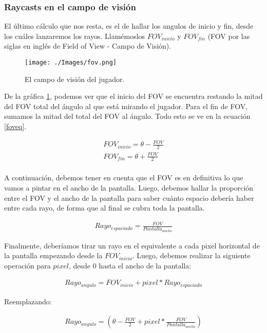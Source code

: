 \subsubsection{Raycasts en el campo de visión}

El último cálculo que nos resta, es el de hallar los angulos de inicio y fin, desde los cuáles lanzaremos los rayos. Llamémoslos $FOV_{inicio}$ y $FOV_{fin}$ (FOV por las siglas en inglés de Field of View - Campo de Visión).

\begin{figure}[h!]
	\centering
	\texttt{[image: ./Images/fov.png]}
	\caption{El campo de visión del jugador.}
	\label{fovgraph}
\end{figure}

De la gráfica \ref{fovgraph}, podemos ver que el inicio del FOV se encuentra restando la mitad del FOV total del ángulo al que está mirando el jugador. Para el fin de FOV, sumamos la mitad del total del FOV al ángulo. Todo esto se ve en la ecuación \ref{foveq}. 

\begin{equation}
\begin{aligned}
\label{foveq}
FOV_{inicio} = \theta - \frac{FOV}{2}\\
FOV_{fin} = \theta + \frac{FOV}{2} \\
\end{aligned}
\end{equation}

A continuación, debemos tener en cuenta que el FOV es en definitiva lo que vamos a pintar en el ancho de la pantalla. Luego, debemos hallar la proporción entre el FOV y el ancho de la pantalla para saber cuánto espacio debería haber entre cada rayo, de forma que al final se cubra toda la pantalla.

\begin{equation}
\begin{aligned}
\label{foveq}
Rayo_{espaciado} = \frac{FOV}{Pantalla_{ancho}}
\end{aligned}
\end{equation}

Finalmente, deberíamos tirar un rayo en el equivalente a cada pixel horizontal de la pantalla empezando desde la $FOV_{inicio}$. Luego, debemos realizar la siguiente operación para $pixel$, desde 0 hasta el ancho de la pantalla:

\begin{equation}
\begin{aligned}
\label{foveq}
Rayo_{angulo} = FOV_{inicio} + pixel * Rayo_{espaciado} 
\end{aligned}
\end{equation}

Reemplazando:

\begin{equation}
\begin{aligned}
\label{foveq}
Rayo_{angulo} = \left(\theta - \frac{FOV}{2} + pixel * \frac{FOV}{Pantalla_{ancho}} \right)
\end{aligned}
\end{equation}

